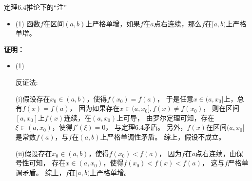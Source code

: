 \documentclass{article}
\begin{document}
\begin{zremark}
  定理6.4推论下的“注”
  \begin{itemize}
    \item
          (1) 函数$f$在区间$(a, b)$上严格单增，如果$f$在$a$点右连续，那么$f$在$[a, b)$上严格单增。
  \end{itemize}
\end{zremark}

\textbf{证明：}

\begin{itemize}
  \item (1)

        反证法:

        (i)假设存在$x_0 \in (a, b)$，使得$f(x_0) = f(a)$，
        于是任意$x \in (a, x_0]$上，总有$f(x) = f(a)$，
        因为如果存在$x \in (a, x_0], f(x) \neq f(x_0)$，
        则在区间$[a, x_0]$上$f(x)$连续，在$(a, x_0)$上可导，
        由罗尔定理可知，存在$\xi \in (a, x_0)$，使得$f'(\xi) = 0$，
        与定理6.4矛盾。
        另外，$f(x)$在区间$(a, x_0]$是常数$f(a)$，与$f$在$(a, b)$上严格单调性矛盾。
        综上，假设不成立。

        (ii)假设存在$x_0 \in (a, b)$，使得$f(x_0) < f(a)$，
        因为$f$在$a$点右连续，由保号性可知，
        存在$x \in (a, x_0)$，使得$f(x_0) < f(x) < f(a)$，
        这与$f$严格单调矛盾。
        综上，$f$在$[a, b)$上严格单增。

\end{itemize}
\end{document}
